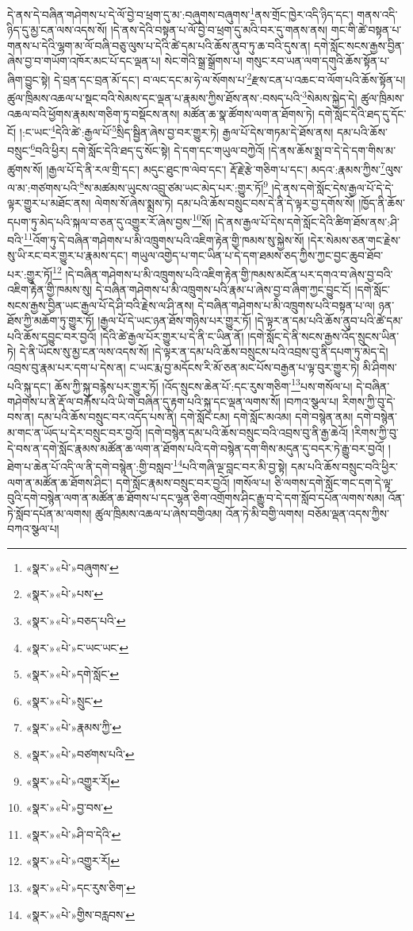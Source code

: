 དེ་ནས་དེ་བཞིན་གཤེགས་པ་དེ་ལོ་བྱེ་བ་ཕྲག་དུ་མ་:བཞུགས་བཞུགས་\footnote{«སྣར་»«པེ་»བཞུགས་}ནས་གྲོང་ཁྱེར་འདི་ཉིད་དང་། གནས་འདི་ཉིད་དུ་མྱ་ངན་ལས་འདས་སོ། །དེ་ནས་དེའི་བསྟན་པ་ལོ་བྱེ་བ་ཕྲག་དུ་མའི་བར་དུ་གནས་ནས། གང་གི་ཚེ་བསྟན་པ་གནས་པ་དེའི་ལྷག་མ་ལོ་བཞི་བཅུ་ལུས་པ་དེའི་ཚེ་དམ་པའི་ཆོས་ནུབ་ཏུ་ཆ་བའི་དུས་ན། དགེ་སློང་སངས་རྒྱས་བྱིན་ཞེས་བྱ་བ་གཡོག་འཁོར་མང་པོ་དང་ལྡན་པ། སེང་གེའི་སྒྲ་སྒྲོགས་པ། གསུང་རབ་ཡན་ལག་དགུའི་ཆོས་སྟོན་པ་ཞིག་བྱུང་སྟེ། དེ་བྲན་དང་བྲན་མོ་དང་། བ་ལང་དང་མ་ཧེ་ལ་སོགས་པ་\footnote{«སྣར་»«པེ་»པས་}རྫས་ངན་པ་འཆང་བ་ལོག་པའི་ཆོས་སྟོན་པ། ཚུལ་ཁྲིམས་འཆལ་པ་སྡང་བའི་སེམས་དང་ལྡན་པ་རྣམས་ཀྱིས་ཐོས་ནས་:བསད་པའི་\footnote{«སྣར་»«པེ་»བཅད་པའི་}སེམས་སྐྱེད་དེ། ཚུལ་ཁྲིམས་འཆལ་བའི་ཕྱོགས་རྣམས་གཅིག་ཏུ་བསྡོངས་ནས། མཚོན་ཆ་སྣ་ཚོགས་ལག་ན་ཐོགས་ཏེ། དགེ་སློང་དེའི་ཐད་དུ་དོང་ངོ། །:ང་ཡང་\footnote{«སྣར་»«པེ་»ང་ཡང་ཡང་}དེའི་ཚེ་:རྒྱལ་པོ་\footnote{«སྣར་»«པེ་»དགེ་སློང་}སྲིད་སྦྱིན་ཞེས་བྱ་བར་གྱུར་ཏེ། རྒྱལ་པོ་དེས་གཏམ་དེ་ཐོས་ནས། དམ་པའི་ཆོས་བསྲུང་\footnote{«སྣར་»«པེ་»སྲུང་}བའི་ཕྱིར། དགེ་སློང་དེའི་ཐད་དུ་སོང་སྟེ། དེ་དག་དང་གཡུལ་བཀྱེའོ། །དེ་ནས་ཆོས་སྨྲ་བ་དེ་དེ་དག་གིས་མ་ཚུགས་སོ། །རྒྱལ་པོ་དེ་ནི་རལ་གྲི་དང་། མདུང་ཐུང་ཁ་ལེབ་དང་། རྡོ་རྗེ་རྩེ་གཅིག་པ་དང་། མདའ་:རྣམས་ཀྱིས་\footnote{«སྣར་»«པེ་»རྣམས་ཀྱི་}ལུས་ལ་མ་:གཙགས་པའི་\footnote{«སྣར་»«པེ་»བཙགས་པའི་}ས་མཚམས་ཡུངས་འབྲུ་ཙམ་ཡང་མེད་པར་:གྱུར་ཏོ།\footnote{«སྣར་»«པེ་»འགྱུར་རོ།} །དེ་ནས་དགེ་སློང་དེས་རྒྱལ་པོ་དེ་དེ་ལྟར་གྱུར་པ་མཐོང་ནས། ལེགས་སོ་ཞེས་སྨྲས་ཏེ། དམ་པའི་ཆོས་བསྲུང་བས་དེ་ནི་དེ་ལྟར་བྱ་དགོས་སོ། །ཁྱོད་ནི་ཆོས་དཔག་ཏུ་མེད་པའི་སྐལ་བ་ཅན་དུ་འགྱུར་རོ་ཞེས་བྱས་\footnote{«སྣར་»«པེ་»བྱ་བས་}སོ། །དེ་ནས་རྒྱལ་པོ་དེས་དགེ་སློང་དེའི་ཚིག་ཐོས་ནས་:ཤི་བའི་\footnote{«སྣར་»«པེ་»ཤི་བ་དེའི་}འོག་ཏུ་དེ་བཞིན་གཤེགས་པ་མི་འཁྲུགས་པའི་འཇིག་རྟེན་གྱི་ཁམས་སུ་སྐྱེས་སོ། །དེར་སེམས་ཅན་གང་རྗེས་སུ་ཡི་རང་བར་གྱུར་པ་རྣམས་དང་། གཡུལ་འགྱེད་པ་གང་ཡིན་པ་དེ་དག་ཐམས་ཅད་ཀྱིས་ཀྱང་བྱང་ཆུབ་ཐོབ་པར་:གྱུར་ཏོ།\footnote{«སྣར་»«པེ་»འགྱུར་རོ།} །དེ་བཞིན་གཤེགས་པ་མི་འཁྲུགས་པའི་འཇིག་རྟེན་གྱི་ཁམས་མངོན་པར་དགའ་བ་ཞེས་བྱ་བའི་འཇིག་རྟེན་གྱི་ཁམས་སུ། དེ་བཞིན་གཤེགས་པ་མི་འཁྲུགས་པའི་རྣམ་པ་ཞེས་བྱ་བ་ཞིག་ཀྱང་བྱུང་ངོ། །དགེ་སློང་སངས་རྒྱས་བྱིན་ཡང་རྒྱལ་པོ་དེ་ཤི་བའི་རྗེས་ལ་ཤི་ནས། དེ་བཞིན་གཤེགས་པ་མི་འཁྲུགས་པའི་བསྟན་པ་ལ། ཉན་ཐོས་ཀྱི་མཆོག་ཏུ་གྱུར་ཏོ། །རྒྱལ་པོ་དེ་ཡང་ཉན་ཐོས་གཉིས་པར་གྱུར་ཏོ། །དེ་ལྟར་ན་དམ་པའི་ཆོས་ནུབ་པའི་ཚེ་དམ་པའི་ཆོས་དབྱུང་བར་བྱའོ། །དེའི་ཚེ་རྒྱལ་པོར་གྱུར་པ་དེ་ནི་ང་ཡིན་ནོ། །དགེ་སློང་དེ་ནི་སངས་རྒྱས་འོད་སྲུངས་ཡིན་ཏེ། དེ་ནི་ཡོངས་སུ་མྱ་ངན་ལས་འདས་སོ། །དེ་ལྟར་ན་དམ་པའི་ཆོས་བསྲུངས་པའི་འབྲས་བུ་ནི་དཔག་ཏུ་མེད་དེ། འབྲས་བུ་རྣམ་པར་དག་པ་དེས་ན། ང་ཡང་རྨ་བྱ་མདོངས་རི་མོ་ཅན་མང་པོས་བརྒྱན་པ་ལྟ་བུར་གྱུར་ཏེ། མི་ཤིགས་པའི་སྐུ་དང་། ཆོས་ཀྱི་སྐུ་བརྙེས་པར་གྱུར་ཏོ། །འོད་སྲུངས་ཆེན་པོ་:དང་རུས་གཅིག་\footnote{«སྣར་»«པེ་»དང་རུས་ཅིག་}པས་གསོལ་པ། དེ་བཞིན་གཤེགས་པ་ནི་རྡོ་ལ་བརྐོས་པའི་ཡི་གེ་བཞིན་དུ་རྟག་པའི་སྐུ་དང་ལྡན་ལགས་སོ། །བཀའ་སྩལ་པ། རིགས་ཀྱི་བུ་དེ་བས་ན། དམ་པའི་ཆོས་བསྲུང་བར་འདོད་པས་ནི། དགེ་སློང་ངམ། དགེ་སློང་མའམ། དགེ་བསྙེན་ནམ། དགེ་བསྙེན་མ་གང་ན་ཡོད་པ་དེར་བསྲུང་བར་བྱའོ། །དགེ་བསྙེན་དམ་པའི་ཆོས་བསྲུང་བའི་འབྲས་བུ་ནི་རྒྱ་ཆེའོ། །རིགས་ཀྱི་བུ་དེ་བས་ན་དགེ་སློང་རྣམས་མཚོན་ཆ་ལག་ན་ཐོགས་པའི་དགེ་བསྙེན་དག་གིས་མདུན་དུ་བདར་ཏེ་རྒྱུ་བར་བྱའོ། །ཐེག་པ་ཆེན་པོ་འདི་ལ་ནི་དགེ་བསྙེན་:གྱི་བསླབ་\footnote{«སྣར་»«པེ་»གྱིས་བརླབས་}པའི་གཞི་ལྔ་བླང་བར་མི་བྱ་སྟེ། དམ་པའི་ཆོས་བསྲུང་བའི་ཕྱིར་ལག་ན་མཚོན་ཆ་ཐོགས་ཤིང་། དགེ་སློང་རྣམས་བསྲུང་བར་བྱའོ། །གསོལ་པ། ཅི་ལགས་དགེ་སློང་གང་དག་དེ་ལྟ་བུའི་དགེ་བསྙེན་ལག་ན་མཚོན་ཆ་ཐོགས་པ་དང་ལྷན་ཅིག་འགྲོགས་ཤིང་རྒྱུ་བ་དེ་དག་སློབ་དཔོན་ལགས་སམ། འོན་ཏེ་སློབ་དཔོན་མ་ལགས། ཚུལ་ཁྲིམས་འཆལ་པ་ཞེས་བགྱིའམ། འོན་ཏེ་མི་བགྱི་ལགས། བཅོམ་ལྡན་འདས་ཀྱིས་བཀའ་སྩལ་པ། 